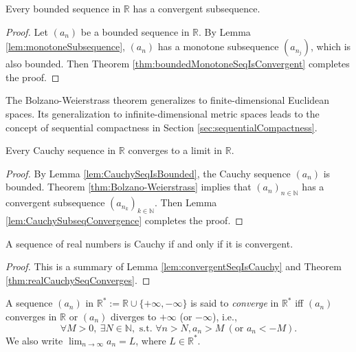 \begin{thm}
  \label{thm:Bolzano-Weierstrass}
  Every bounded sequence in $\mathbb{R}$
  has a convergent subsequence.
\end{thm}
\begin{proof}
  Let $(a_{n})$ be a bounded sequence in $\mathbb{R}$.
  By Lemma \ref{lem:monotoneSubsequence},
  $(a_{n})$ has a monotone subsequence $(a_{n_{j}})$,
  which is also bounded.
  Then Theorem \ref{thm:boundedMonotoneSeqIsConvergent}
  completes the proof.
\end{proof}

\begin{rem}
  The Bolzano-Weierstrass theorem generalizes
  to finite-dimensional Euclidean spaces.
  Its generalization to infinite-dimensional metric spaces
  leads to the concept of sequential compactness
  in Section \ref{sec:sequentialCompactness}. 
\end{rem}

\begin{thm}%
  \label{thm:realCauchySeqConverges}
  Every Cauchy sequence in $\mathbb{R}$
  converges to a limit in $\mathbb{R}$.
\end{thm}
\begin{proof}
  By Lemma \ref{lem:CauchySeqIsBounded},
  the Cauchy sequence $(a_n)$ is bounded.
  Theorem \ref{thm:Bolzano-Weierstrass}
  implies that $(a_n)_{n\in \mathbb{N}}$ has a convergent
  subsequence $(a_{n_k})_{k\in \mathbb{N}}$.
  Then Lemma \ref{lem:CauchySubseqConvergence}
  completes the proof.
\end{proof}

\begin{thm}
  \label{thm:completenessOfRealNumbers}
  A sequence of real numbers is Cauchy
  if and only if it is convergent.
\end{thm}
\begin{proof}
  This is a summary of
  Lemma \ref{lem:convergentSeqIsCauchy}
  and Theorem \ref{thm:realCauchySeqConverges}.
\end{proof}

\begin{defn}
  \label{def:limitOfSequenceInR*}
  A sequence $(a_n)$ in
  $\mathbb{R^{*}}:=\mathbb{R}\cup\{+\infty, -\infty\}$
  is said to \emph{converge} in $\mathbb{R^{*}}$ iff
  $(a_{n})$ converges in $\mathbb{R}$ or
  $(a_{n})$ diverges to $+\infty$ (or $-\infty$), i.e.,
  \begin{equation}
    \label{eq:limitOfSequenceInInfty}
    \forall M>0,\ \exists N\in \mathbb{N},\text{ s.t. }
    \forall n>N, a_{n}>M\ (\text{or }a_{n}<-M).
  \end{equation}
  We also write $\lim_{n\rightarrow \infty} a_n = L$,
  where $L\in \mathbb{R}^{*}$.
\end{defn}

